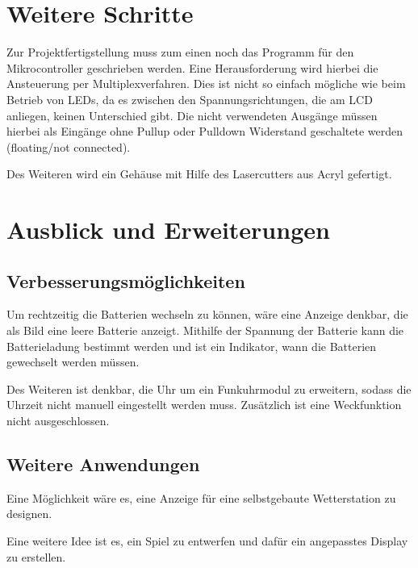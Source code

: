 \section{Weitere Schritte}

Zur Projektfertigstellung muss zum einen noch das Programm für den Mikrocontroller geschrieben werden. Eine Herausforderung wird hierbei die Ansteuerung per Multiplexverfahren. Dies ist nicht so einfach mögliche wie beim Betrieb von LEDs, da es zwischen den Spannungsrichtungen, die am LCD anliegen, keinen Unterschied gibt. Die nicht verwendeten Ausgänge müssen hierbei als Eingänge ohne Pullup oder Pulldown Widerstand geschaltete werden (floating/not connected).

Des Weiteren wird ein Gehäuse mit Hilfe des Lasercutters aus Acryl gefertigt.


\section{Ausblick und Erweiterungen}


\subsection{Verbesserungsmöglichkeiten}

Um rechtzeitig die Batterien wechseln zu können, wäre eine Anzeige denkbar, die als Bild eine leere Batterie anzeigt. Mithilfe der Spannung der Batterie kann die Batterieladung bestimmt werden und ist ein Indikator, wann die Batterien gewechselt werden müssen.

Des Weiteren ist denkbar, die Uhr um ein Funkuhrmodul zu erweitern, sodass die Uhrzeit nicht manuell eingestellt werden muss. Zusätzlich ist eine Weckfunktion nicht ausgeschlossen.


\subsection{Weitere Anwendungen}

Eine Möglichkeit wäre es, eine Anzeige für eine selbstgebaute Wetterstation zu designen.

Eine weitere Idee ist es, ein Spiel zu entwerfen und dafür ein angepasstes Display zu erstellen.

